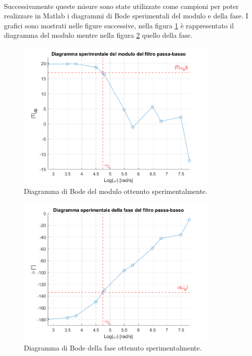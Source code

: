 \documentclass{report}
\begin{document}
\\Successivamente queste misure sono state utilizzate come campioni per poter realizzare in Matlab i diagrammi di Bode sperimentali del modulo e della fase. I grafici sono mostrati nelle figure successive, nella figura \ref{figura:modulosperimentale} è rappresentato il diagramma del modulo mentre nella figura \ref{figura:fasesperimentale} quello della fase. \par %
\begin{figure}[h!]
	\centering
	\includegraphics[height=7.3cm]{immagini/modulo_sper}
	\caption{Diagramma di Bode del modulo ottenuto sperimentalmente.}
	\label{figura:modulosperimentale}
\end{figure}
\begin{figure}[h!]
	\centering
	\includegraphics[height=7.3cm]{immagini/fase_sper}
	\caption{Diagramma di Bode della fase ottenuto sperimentalmente.}
	\label{figura:fasesperimentale}
\end{figure}
\end{document}
